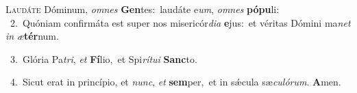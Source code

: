 \lettrine{\initial\textcolor{\initialcolor}{L}}{audáte} Dóminum, \textit{om}\-\textit{nes} \textbf{Gen}\-tes:~\star laudáte e\-\textit{um}\-, \textit{om}\-\textit{nes} \textbf{pó}\-\textbf{pu}li:\\
{\numbfont\textcolor{\numbcolor}{~2.}}~Quóniam confirmáta est super nos misericór\-\textit{di}\-\textit{a} \textbf{e}\-jus:~\star et véritas Dómini ma\textit{net} \textit{in} \textit{æ}\-\textbf{tér}num.\par
{\numbfont\textcolor{\numbcolor}{~3.}}~Glória Pa\-\textit{tri}\-, \textit{et} \textbf{Fí}\-lio,~\star et Spi\-\textit{rí}\-\textit{tu}\textit{i} \textbf{Sanc}\-to.\par
{\numbfont\textcolor{\numbcolor}{~4.}}~Sicut erat in princípio, et \textit{nunc}\-, \textit{et} \textbf{sem}\-per,~\star et in sǽcula sæ\-\textit{cu}\-\textit{ló}\textit{rum}. \textbf{A}\-men.\par
